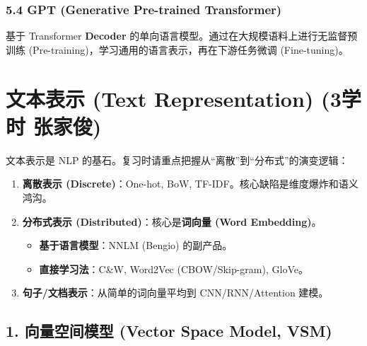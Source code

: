 \documentclass[a4paper, 11pt]{ctexart}
\begin{document}
\subsubsection{5.4 GPT (Generative Pre-trained Transformer)}
基于 Transformer \textbf{Decoder} 的单向语言模型。通过在大规模语料上进行无监督预训练 (Pre-training)，学习通用的语言表示，再在下游任务微调 (Fine-tuning)。

\section{文本表示 (Text Representation) \small{(3学时 张家俊)}}

\begin{note}[本章复习总纲]
文本表示是 NLP 的基石。复习时请重点把握从“离散”到“分布式”的演变逻辑：
\begin{enumerate}
    \item \textbf{离散表示 (Discrete)}：One-hot, BoW, TF-IDF。核心缺陷是维度爆炸和语义鸿沟。
    \item \textbf{分布式表示 (Distributed)}：核心是\textbf{词向量 (Word Embedding)}。
    \begin{itemize}
        \item \textbf{基于语言模型}：NNLM (Bengio) 的副产品。
        \item \textbf{直接学习法}：C\&W, Word2Vec (CBOW/Skip-gram), GloVe。
    \end{itemize}
    \item \textbf{句子/文档表示}：从简单的词向量平均到 CNN/RNN/Attention 建模。
\end{enumerate}
\end{note}

\subsection{1. 向量空间模型 (Vector Space Model, VSM)}
\end{document}
